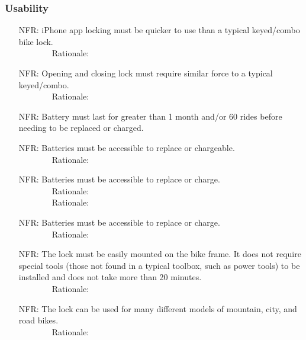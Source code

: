 \documentclass[12pt]{article}
\newcounter{nfrnum} %
\begin{document}
\subsubsection{Usability}
\begin{itemize}
\setlength{\itemindent}{.5in}
\item[NFR\refstepcounter{nfrnum}\thenfrnum\label{NFR11}:] iPhone app locking must be quicker to use than a typical keyed/combo bike lock.
\\ \-\ \-\ \-\ \-\ \-\ \-\ \-\ \-\ Rationale: 
\item[NFR\refstepcounter{nfrnum}\thenfrnum\label{NFR12}:] Opening and closing lock must require similar force to a typical keyed/combo.
\\ \-\ \-\ \-\ \-\ \-\ \-\ \-\ \-\ Rationale: 
\item[NFR\refstepcounter{nfrnum}\thenfrnum\label{NFR13}:] Battery must last for greater than 1 month and/or 60 rides before needing to be replaced or charged.
\item[NFR\refstepcounter{nfrnum}\thenfrnum\label{NFR14}:] Batteries must be accessible to replace or chargeable.
\\ \-\ \-\ \-\ \-\ \-\ \-\ \-\ \-\ Rationale: 
\item[NFR\refstepcounter{nfrnum}\thenfrnum\label{NFR14}:] Batteries must be accessible to replace or charge.
\\ \-\ \-\ \-\ \-\ \-\ \-\ \-\ \-\ Rationale: 
\\ \-\ \-\ \-\ \-\ \-\ \-\ \-\ \-\ Rationale: 
\item[NFR\refstepcounter{nfrnum}\thenfrnum\label{NFR14}:] Batteries must be accessible to replace or charge.
\\ \-\ \-\ \-\ \-\ \-\ \-\ \-\ \-\ Rationale: 
\item[NFR\refstepcounter{nfrnum}\thenfrnum\label{NFR15}:] The lock must be easily mounted on the bike frame. It does not require special tools (those not found in a typical toolbox, such as power tools) to be installed and does not take more than 20 minutes. 
\\ \-\ \-\ \-\ \-\ \-\ \-\ \-\ \-\ Rationale: 
\item[NFR\refstepcounter{nfrnum}\thenfrnum\label{NFR16}:] The lock can be used for many different models of mountain, city, and road bikes. 
\\ \-\ \-\ \-\ \-\ \-\ \-\ \-\ \-\ Rationale: 
\end{itemize}
\end{document}
